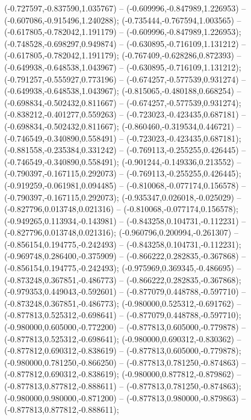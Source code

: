  (-0.727597,-0.837590,1.035767) -- (-0.609996,-0.847989,1.226953) -- (-0.607086,-0.915496,1.240288);
 (-0.735444,-0.767594,1.003565) -- (-0.617805,-0.782042,1.191179) -- (-0.609996,-0.847989,1.226953);
 (-0.748528,-0.698297,0.949874) -- (-0.630895,-0.716109,1.131212) -- (-0.617805,-0.782042,1.191179);
 (-0.767409,-0.628286,0.872393) -- (-0.649938,-0.648538,1.043967) -- (-0.630895,-0.716109,1.131212);
 (-0.791257,-0.555927,0.773196) -- (-0.674257,-0.577539,0.931274) -- (-0.649938,-0.648538,1.043967);
 (-0.815065,-0.480188,0.668254) -- (-0.698834,-0.502432,0.811667) -- (-0.674257,-0.577539,0.931274);
 (-0.838212,-0.401277,0.559263) -- (-0.723023,-0.423435,0.687181) -- (-0.698834,-0.502432,0.811667);
 (-0.860460,-0.319534,0.446721) -- (-0.746549,-0.340890,0.558491) -- (-0.723023,-0.423435,0.687181);
 (-0.881558,-0.235384,0.331242) -- (-0.769113,-0.255255,0.426445) -- (-0.746549,-0.340890,0.558491);
 (-0.901244,-0.149336,0.213552) -- (-0.790397,-0.167115,0.292073) -- (-0.769113,-0.255255,0.426445);
 (-0.919259,-0.061981,0.094485) -- (-0.810068,-0.077174,0.156578) -- (-0.790397,-0.167115,0.292073);
 (-0.935347,0.026018,-0.025029) -- (-0.827796,0.013748,0.021316) -- (-0.810068,-0.077174,0.156578);
 (-0.949265,0.113934,-0.143981) -- (-0.843258,0.104731,-0.112231) -- (-0.827796,0.013748,0.021316);
 (-0.960796,0.200994,-0.261307) -- (-0.856154,0.194775,-0.242493) -- (-0.843258,0.104731,-0.112231);
 (-0.969748,0.286400,-0.375909) -- (-0.866222,0.282835,-0.367868) -- (-0.856154,0.194775,-0.242493);
 (-0.975969,0.369345,-0.486695) -- (-0.873248,0.367851,-0.486773) -- (-0.866222,0.282835,-0.367868);
 (-0.979353,0.449043,-0.592601) -- (-0.877079,0.448788,-0.597710) -- (-0.873248,0.367851,-0.486773);
 (-0.980000,0.525312,-0.691762) -- (-0.877813,0.525312,-0.698641) -- (-0.877079,0.448788,-0.597710);
 (-0.980000,0.605000,-0.772200) -- (-0.877813,0.605000,-0.779878) -- (-0.877813,0.525312,-0.698641);
 (-0.980000,0.690312,-0.830362) -- (-0.877812,0.690312,-0.838619) -- (-0.877813,0.605000,-0.779878);
 (-0.980000,0.781250,-0.866250) -- (-0.877813,0.781250,-0.874863) -- (-0.877812,0.690312,-0.838619);
 (-0.980000,0.877812,-0.879862) -- (-0.877813,0.877812,-0.888611) -- (-0.877813,0.781250,-0.874863);
 (-0.980000,0.980000,-0.871200) -- (-0.877813,0.980000,-0.879863) -- (-0.877813,0.877812,-0.888611);
